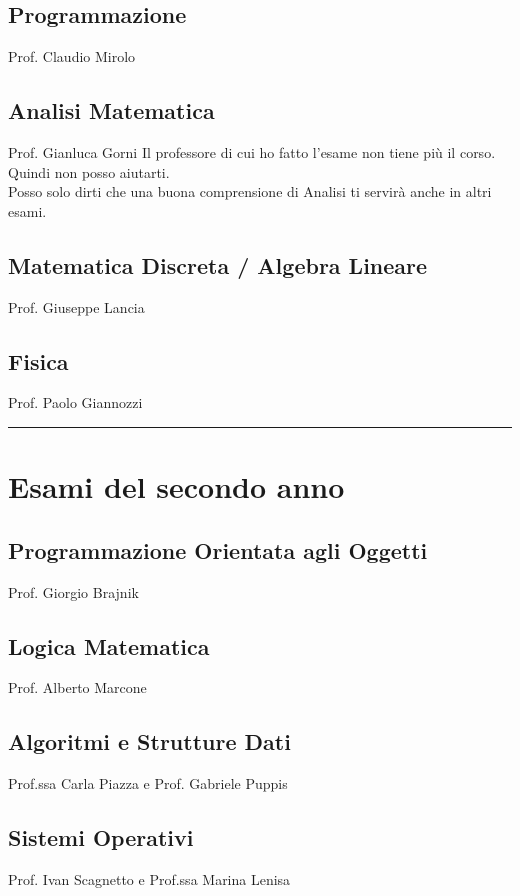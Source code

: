 \documentclass[18pt]{extarticle}
\begin{document}
\subsection{Programmazione}
Prof. Claudio Mirolo

\subsection{Analisi Matematica}
Prof. Gianluca Gorni
Il professore di cui ho fatto l'esame non tiene più il corso. Quindi non posso aiutarti.\\ 
Posso solo dirti che una buona comprensione di Analisi ti servirà anche in altri esami.

\subsection{Matematica Discreta / Algebra Lineare}
Prof. Giuseppe Lancia

\subsection{Fisica}
Prof. Paolo Giannozzi

\noindent\rule{\textwidth}{0.6pt}

\section{Esami del secondo anno}
\subsection{Programmazione Orientata agli Oggetti}
Prof. Giorgio Brajnik

\subsection{Logica Matematica}
Prof. Alberto Marcone

\subsection{Algoritmi e Strutture Dati}
Prof.ssa Carla Piazza e Prof. Gabriele Puppis

\subsection{Sistemi Operativi}
Prof. Ivan Scagnetto e Prof.ssa Marina Lenisa
\end{document}
